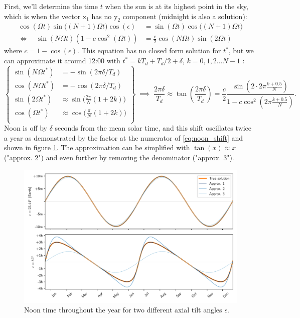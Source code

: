 \documentclass[12pt]{article}
\begin{document}
First, we'll determine the time $t$ when the sun is at its highest point in the
sky, which is when the vector $\mathrm{x}_1$ has no $\mathrm{y}_2$ component 
(midnight is also a solution):
\begin{equation}
    \begin{aligned}
        \cos(\Omega t)\sin\big((N+1)\Omega t\big) \cos(\epsilon) &= \sin(\Omega t) \cos\big((N+1)\Omega t\big)\\
        \iff \quad \sin(N\Omega t)(1-c \cos^2(\Omega t)) &= \frac{c}{2} \cos(N\Omega t) \sin(2\Omega t)
    \end{aligned}
\end{equation}
where $c=1-\cos(\epsilon)$. This equation has no closed form solution for $t^*$,
but we can approximate it around 12:00 with $t^*=kT_d+T_d/2+\delta$, $k=0,1,2\ldots N-1$
:
\begin{equation}
    \left\{
        \begin{aligned}
            \sin(N\Omega t^*) &= -\sin(2\pi\delta / T_d)\\
            \cos(N\Omega t^*) &= -\cos(2\pi\delta / T_d)\\
            \sin(2\Omega t^*) &\approx \sin\big(\tfrac{2\pi}{N} (1+2k)\big)\\
            \cos(\Omega t^*) &\approx \cos\big(\tfrac{\:\pi\:}{N} (1+2k)\big)\\
        \end{aligned}
    \right\} \; \implies \;
    \frac{2\pi \delta}{T_d} \approx \tan(\frac{2\pi \delta}{T_d}) = 
    \frac{c}{2} \frac{\sin(2\cdot 2\pi \tfrac{k+0.5}{N})}{1-c \cos^2(2\pi \tfrac{k+0.5}{N})}.
    \label{eq:noon_shift}
\end{equation}
Noon is off by $\delta$ seconds from the mean solar time, and this shift
oscillates twice a year as demonstrated by the factor at the numerator of 
\eqref{eq:noon_shift} and shown in figure \ref{fig:noon_shift}. 
The approximation can be simplified with $\tan(x) \approx x$ 
("approx. 2") and even further by removing the denominator ("approx. 3").

\begin{figure}[ht]
    \centering
    \includegraphics[width=\textwidth]{./noon_computed.pdf}
    \caption{
        Noon time throughout the year for two different axial tilt angles $\epsilon$.
    }
    \label{fig:noon_shift}
\end{figure}
\end{document}
